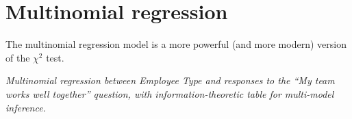 \documentclass[]{book}
\newenvironment{Shaded}{\begin{snugshade}}{\end{snugshade}}
\newcommand{\KeywordTok}[1]{\textcolor[rgb]{0.13,0.29,0.53}{\textbf{{#1}}}}
\newcommand{\DataTypeTok}[1]{\textcolor[rgb]{0.13,0.29,0.53}{{#1}}}
\newcommand{\DecValTok}[1]{\textcolor[rgb]{0.00,0.00,0.81}{{#1}}}
\newcommand{\StringTok}[1]{\textcolor[rgb]{0.31,0.60,0.02}{{#1}}}
\newcommand{\CommentTok}[1]{\textcolor[rgb]{0.56,0.35,0.01}{\textit{{#1}}}}
\newcommand{\OtherTok}[1]{\textcolor[rgb]{0.56,0.35,0.01}{{#1}}}
\newcommand{\NormalTok}[1]{{#1}}
\begin{document}
\hypertarget{Advanced}{\section{Multinomial regression}\label{Advanced}}

The multinomial regression model is a more powerful (and more modern)
version of the \(\chi^2\) test.

\emph{Multinomial regression between Employee Type and responses to the
``My team works well together'' question, with information-theoretic
table for multi-model inference.}

\begin{Shaded}
\end{Shaded}
\end{document}
